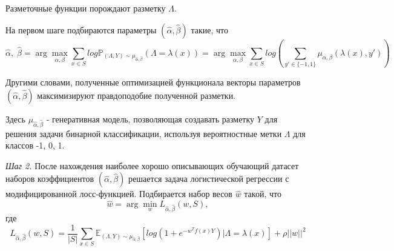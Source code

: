 \par
Разметочные функции порождают разметку $\Lambda$.
\par
На первом шаге подбираются параметры $(\hat{\alpha}, \hat{\beta})$ такие, что
\begin{equation}
    \hat{\alpha},\;\hat{\beta} = \arg\max_{\alpha,\beta}\sum_{x\in S}log\mathbb{P}_{(\Lambda, Y)\sim\mu_{\hat{\alpha}, \hat{\beta}}}\left(\Lambda=\lambda (x)\right)=
    \arg\max_{\alpha,\beta}\sum_{x\in S}log\left(  \sum_{y'\in\{-1,1\}} \mu_{\alpha,\beta} (\lambda(x),y')\right)
\end{equation}
\par
Другими словами, полученные оптимизацией функционала векторы параметров $(\hat{\alpha}, \hat{\beta})$ максимизируют правдоподобие полученной разметки.
\par
Здесь $\mu_{\hat{\alpha}, \hat{\beta}}$ - генеративная модель, позволяющая создавать разметку $Y$ для решения задачи бинарной классификации, используя вероятностные метки $\Lambda$ для классов {-1, 0, 1}.
\par
\textit{Шаг 2.}
После нахождения наиболее хорошо описывающих обучающий датасет наборов коэффициентов $(\hat{\alpha}, \hat{\beta})$ решается задача логистической регрессии с модифицированной лосс-функцией. Подбирается набор весов $\hat{w}$ такой, что
\begin{equation}
    \hat{w} = \arg\min_w L_{\hat{\alpha},\hat{\beta}}\left(w,S\right),
\end{equation}
где
\begin{equation}
    L_{\hat{\alpha},\hat{\beta}}\left(w,S\right) = 
    \frac{1}{|S|}\sum_{x\in S}\mathbb{E}_{(\Lambda, Y)\sim\mu_{\hat{\alpha}, \hat{\beta}}}
    \left[log\left(1+e^{-w^Tf(x)Y}\right)|\Lambda=\lambda(x)\right]
    +\rho ||w||^2
\end{equation}

